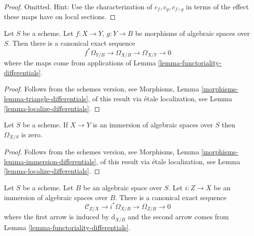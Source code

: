 \begin{proof}
Omitted. Hint: Use the characterization of $c_f, c_g, c_{f \circ g}$
in terms of the effect these maps have on local sections.
\end{proof}

\begin{lemma}
\label{lemma-triangle-differentials}
Let $S$ be a scheme.
Let $f : X \to Y$, $g : Y \to B$ be morphisms of algebraic spaces over $S$.
Then there is a canonical exact sequence
$$
f^*\Omega_{Y/B} \to \Omega_{X/B} \to \Omega_{X/Y} \to 0
$$
where the maps come from applications of
Lemma \ref{lemma-functoriality-differentials}.
\end{lemma}

\begin{proof}
Follows from the schemes version, see
Morphisms, Lemma \ref{morphisms-lemma-triangle-differentials},
of this result via \'etale localization, see
Lemma \ref{lemma-localize-differentials}.
\end{proof}

\begin{lemma}
\label{lemma-immersion-differentials}
Let $S$ be a scheme. If $X \to Y$ is an immersion
of algebraic spaces over $S$ then $\Omega_{X/S}$ is zero.
\end{lemma}

\begin{proof}
Follows from the schemes version, see
Morphisms, Lemma \ref{morphisms-lemma-immersion-differentials},
of this result via \'etale localization, see
Lemma \ref{lemma-localize-differentials}.
\end{proof}

\begin{lemma}
\label{lemma-differentials-relative-immersion}
Let $S$ be a scheme. Let $B$ be an algebraic space over $S$.
Let $i : Z \to X$ be an immersion of algebraic spaces over $B$.
There is a canonical exact sequence
$$
\mathcal{C}_{Z/X} \to i^*\Omega_{X/B} \to \Omega_{Z/B} \to 0
$$
where the first arrow is induced by $\text{d}_{X/B}$
and the second arrow comes from
Lemma \ref{lemma-functoriality-differentials}.
\end{lemma}

